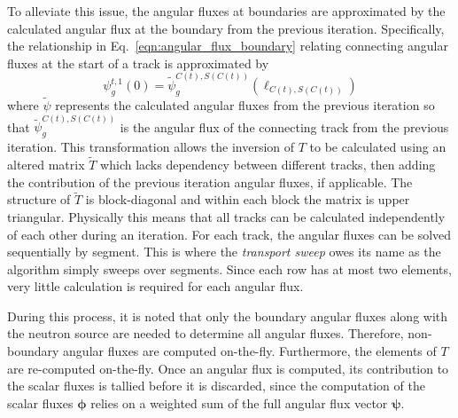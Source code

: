 To alleviate this issue, the angular fluxes at boundaries are approximated by the calculated angular flux at the boundary from the previous iteration. Specifically, the relationship in Eq.~\ref{eqn:angular_flux_boundary} relating connecting angular fluxes at the start of a track is approximated by
\begin{dmath}
	\psi_g^{t,1}(0) = \widetilde{\psi}_g^{C(t),S(C(t))}(\ell_{C(t),S(C(t))})
\end{dmath}
where $\widetilde{\psi}$ represents the calculated angular fluxes from the previous iteration so that $\widetilde{\psi}_g^{C(t),S(C(t))}$ is the angular flux of the connecting track from the previous iteration. This transformation allows the inversion of $T$ to be calculated using an altered matrix $\tilde{T}$ which lacks dependency between different tracks, then adding the contribution of the previous iteration angular fluxes, if applicable. The structure of $\tilde{T}$ is block-diagonal and within each block the matrix is upper triangular. Physically this means that all tracks can be calculated independently of each other during an iteration. For each track, the angular fluxes can be solved sequentially by segment. This is where the \textit{transport sweep} owes its name as the algorithm simply sweeps over segments. Since each row has at most two elements, very little calculation is required for each angular flux. 

During this process, it is noted that only the boundary angular fluxes along with the neutron source are needed to determine all angular fluxes. Therefore, non-boundary angular fluxes are computed on-the-fly. Furthermore, the elements of $T$ are re-computed on-the-fly. Once an angular flux is computed, its contribution to the scalar fluxes is tallied before it is discarded, since the computation of the scalar fluxes $\boldsymbol{\phi}$ relies on a weighted sum of the full angular flux vector $\boldsymbol{\psi}$.

